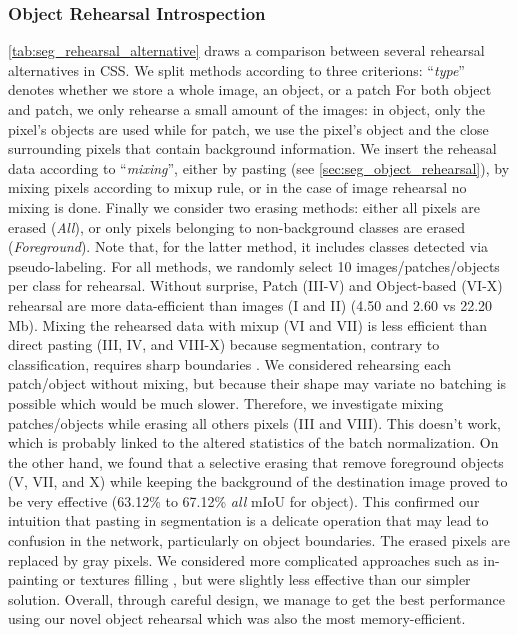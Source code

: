 \subsubsection{Object Rehearsal Introspection}

\autoref{tab:seg_rehearsal_alternative} draws a comparison between several rehearsal alternatives in
\ac{CSS}. We split methods according to three criterions: ``\textit{type}'' denotes whether we store a
whole image, an object, or a patch For both object and patch, we only rehearse a small amount of the
images: in object, only the pixel's objects are used while for patch, we use the pixel's object and
the close surrounding pixels that contain background information. We insert the reheasal data
according to ``\textit{mixing}'', either by pasting (see \autoref{sec:seg_object_rehearsal}), by
mixing pixels according to mixup \citep{hingyi2018mixup} rule, or in the case of image rehearsal no
mixing is done. Finally we consider two erasing methods: either all pixels are erased
(\textit{All}), or only pixels belonging to non-background classes are erased (\textit{Foreground}).
Note that, for the latter method, it includes classes detected via pseudo-labeling. For all methods,
we randomly select 10 images/patches/objects per class for rehearsal. Without surprise, Patch
(III-V) and Object-based (VI-X) rehearsal are more data-efficient than images (I and II) (4.50 and
2.60 vs 22.20 Mb). Mixing the rehearsed data with mixup (VI and VII) is less efficient than direct
pasting (III, IV, and VIII-X) because segmentation, contrary to classification, requires sharp
boundaries \citep{chen2020semeda}. We considered rehearsing each patch/object without mixing, but
because their shape may variate no batching is possible which would be much slower. Therefore, we
investigate mixing patches/objects while erasing all others pixels (III and VIII). This doesn't
work, which is probably linked to the altered statistics of the batch normalization. On the other
hand, we found that a selective erasing that remove foreground objects (V, VII, and X) while keeping
the background of the destination image proved to be very effective (63.12\% to 67.12\% \textit{all}
\ac{mIoU} for object). This confirmed our intuition that pasting in segmentation is a delicate
operation that may lead to confusion in the network, particularly on object boundaries. The erased
pixels are replaced by gray pixels. We considered more complicated approaches such as in-painting
\citep{fang2019instaboost} or textures filling \citep{mallikarjuna2006kth-tips}, but were slightly
less effective than our simpler solution. Overall, through careful design, we manage to get the best
performance using our novel object rehearsal which was also the most memory-efficient.


